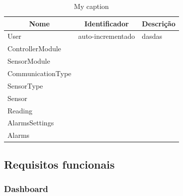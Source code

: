 \newpage

\begin{table}[h]
	\centering
	\begin{tabular}{|l|l|l|}
		\hline
		\multicolumn{1}{|c|}{\textbf{Nome}} & \multicolumn{1}{c|}{\textbf{Identificador}} & \multicolumn{1}{c|}{\textbf{Descrição}} \\ \hline
		User & auto-incrementado & dasdas \\ \hline
		ControllerModule&  &  \\ \hline
		SensorModule&  &  \\ \hline
		CommunicationType&  &  \\ \hline
		SensorType&  &  \\ \hline
		Sensor&  &  \\ \hline
		Reading&  &  \\ \hline
		AlarmsSettings&  &  \\ \hline
		Alarms&  &  \\ \hline
	\end{tabular}
	\caption{My caption}
	\label{my-label}
\end{table}









\newpage











\subsection{Requisitos funcionais}







\subsubsection{Dashboard}


